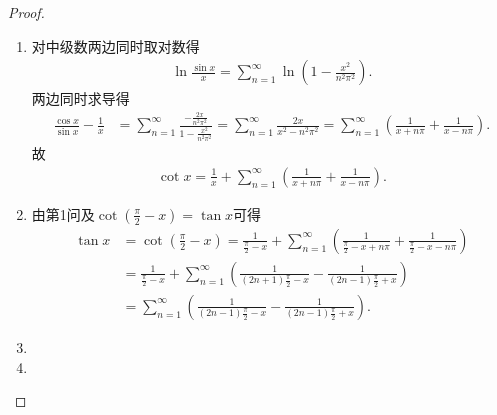 \documentclass[../../main.tex]{subfiles}
\begin{document}
\begin{proof}
\begin{enumerate}
\item 对中级数两边同时取对数得
\begin{align*}
\ln \frac{\sin x}{x} = \sum_{n=1}^{\infty} \ln \left(1 - \frac{x^2}{n^2\pi^2}\right).
\end{align*}
两边同时求导得
\begin{align*}
\frac{\cos x}{\sin x} - \frac{1}{x} &= \sum_{n=1}^{\infty} \frac{-\frac{2x}{n^2\pi^2}}{1 - \frac{x^2}{n^2\pi^2}} = \sum_{n=1}^{\infty} \frac{2x}{x^2 - n^2\pi^2} = \sum_{n=1}^{\infty} \left( \frac{1}{x + n\pi} + \frac{1}{x - n\pi} \right).
\end{align*}
故
\begin{align*}
\cot x = \frac{1}{x} + \sum_{n=1}^{\infty} \left( \frac{1}{x + n\pi} + \frac{1}{x - n\pi} \right).
\end{align*}

\item 由第1问及$\cot \left( \frac{\pi}{2}-x \right) =\tan x$可得
\begin{align*}
\tan x&=\cot \left( \frac{\pi}{2}-x \right) =\frac{1}{\frac{\pi}{2}-x}+\sum_{n=1}^{\infty}{\left( \frac{1}{\frac{\pi}{2}-x+n\pi}+\frac{1}{\frac{\pi}{2}-x-n\pi} \right)}\\
&=\frac{1}{\frac{\pi}{2}-x}+\sum_{n=1}^{\infty}{\left( \frac{1}{\left( 2n+1 \right) \frac{\pi}{2}-x}-\frac{1}{\left( 2n-1 \right) \frac{\pi}{2}+x} \right)}\\
&=\sum_{n=1}^{\infty}{\left( \frac{1}{\left( 2n-1 \right) \frac{\pi}{2}-x}-\frac{1}{\left( 2n-1 \right) \frac{\pi}{2}+x} \right)}.
\end{align*}

\item 

\item 
\end{enumerate}

\end{proof}
\end{document}
